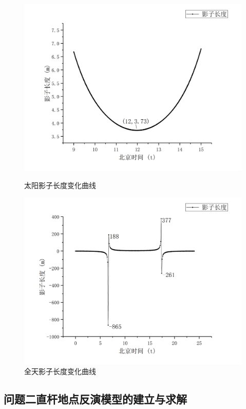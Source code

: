 \documentclass[12pt]{cumcmart}   %
\begin{document}
\begin{figure}[h]
	\centering
	\begin{minipage}{.45\textwidth}
		\centering
		\includegraphics[width=.95\textwidth]{images/yingchang.png}
		\caption{太阳影子长度变化曲线}
		\label{yingchang}
	\end{minipage}\hfill
	\begin{minipage}{.45\textwidth}
		\centering
		\includegraphics[width=.95\textwidth]{images/yingchangtian.png}
		\caption{全天影子长度变化曲线}
		\label{yingchangtian}
	\end{minipage}	
\end{figure}



\subsection{问题二直杆地点反演模型的建立与求解}
\end{document}
